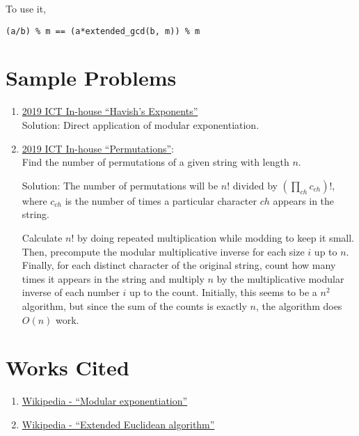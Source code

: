 \documentclass[11pt, oneside]{article}
\begin{document}
To use it,
\begin{verbatim}
(a/b) % m == (a*extended_gcd(b, m)) % m
\end{verbatim}

\section{Sample Problems}

\begin{enumerate}
  \item \href{https://codeforces.com/group/M4wsRWBHyZ/contest/238084/problem/E}{2019 ICT In-house ``Havish's Exponents''} \\
  Solution: Direct application of modular exponentiation.

  \item \href{https://codeforces.com/group/M4wsRWBHyZ/contest/238084/problem/G}{2019 ICT In-house ``Permutations''}: \\
  Find the number of permutations of a given string with length \( n \).

  Solution: The number of permutations will be \( n! \) divided by \( (\prod_{ch} c_{ch})! \), where
  \( c_{ch} \) is the number of times a particular character \( ch \) appears in the string.

  Calculate \( n! \) by doing repeated multiplication while modding to keep it small. Then, precompute
  the modular multiplicative inverse for each size \( i \) up to \( n \). Finally, for each distinct
  character of the original string, count how many times it appears in the string and multiply \( n \)
  by the multiplicative modular inverse of each number \( i \) up to the count. Initially, this seems to be a \( n^2 \) algorithm, but since the sum of the counts is exactly \( n \), the algorithm does \( O(n) \) work.

\end{enumerate}

\section{Works Cited}

\begin{enumerate}
  \item \href{https://en.wikipedia.org/wiki/Modular_exponentiation}{Wikipedia - ``Modular exponentiation''}
  \item \href{https://en.wikipedia.org/wiki/Extended_Euclidean_algorithm}{Wikipedia - ``Extended Euclidean algorithm''}
\end{enumerate}
\end{document}
